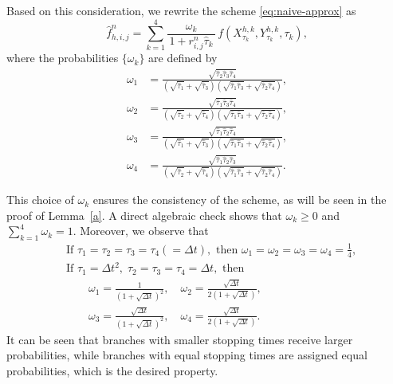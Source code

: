 \documentclass[11pt]{article}
\theoremstyle{mythm}
\theoremstyle{definition}
\begin{document}
	Based on this consideration, we rewrite the scheme \eqref{eq:naive-approx} as
	\begin{equation}\label{eq:weighted-scheme}
		\hat f_{h,i,j}^n
		= \sum_{k=1}^4 \frac{\omega_k}{\,1+r_{i,j}^n\hat\tau_k\,}\,
		f(X_{\tau_k}^{h,k}, Y_{\tau_k}^{h,k}, \tau_k),
	\end{equation}
	where the probabilities $\{\omega_k\}$ are defined by
	\begin{equation}\label{eq:omega}
		\begin{aligned}
			\omega_1 &= \frac{\sqrt{\hat\tau_2 \hat\tau_3 \hat\tau_4}}
			{(\sqrt{\hat\tau_1}+\sqrt{\hat\tau_3})(\sqrt{\hat\tau_1 \hat\tau_3}+\sqrt{\hat\tau_2 \hat\tau_4})},\\
			\omega_2 &= \frac{\sqrt{\hat\tau_1 \hat\tau_3 \hat\tau_4}}
			{(\sqrt{\hat\tau_2}+\sqrt{\hat\tau_4})(\sqrt{\hat\tau_1 \hat\tau_3}+\sqrt{\hat\tau_2 \hat\tau_4})},\\
			\omega_3 &= \frac{\sqrt{\hat\tau_1 \hat\tau_2 \hat\tau_4}}
			{(\sqrt{\hat\tau_1}+\sqrt{\hat\tau_3})(\sqrt{\hat\tau_1 \hat\tau_3}+\sqrt{\hat\tau_2 \hat\tau_4})},\\
			\omega_4 &= \frac{\sqrt{\hat\tau_1 \hat\tau_2 \hat\tau_3}}
			{(\sqrt{\hat\tau_2}+\sqrt{\hat\tau_4})(\sqrt{\hat\tau_1 \hat\tau_3}+\sqrt{\hat\tau_2 \hat\tau_4})}.
		\end{aligned}
	\end{equation}
	
	This choice of $\omega_k$ ensures the consistency of the scheme, as will be seen in the proof of Lemma~\ref{a}. A direct algebraic check shows that $\omega_k \ge 0$ and $\sum_{k=1}^4 \omega_k = 1$. Moreover, we observe that
	\[
	\begin{aligned}
		&\text{If } \tau_1 = \tau_2 = \tau_3 = \tau_4 (= \Delta t),
		\text{ then } \omega_1 = \omega_2 = \omega_3 = \omega_4 = \tfrac14,\\
		&\text{If } \tau_1 = \Delta t^2, \; \tau_2 = \tau_3 = \tau_4 = \Delta t, \text{ then}\\
		&\qquad \omega_1 = \frac{1}{(\!1+\sqrt{\Delta t}\!)^2},\quad
		\omega_2 = \frac{\sqrt{\Delta t}}{2(\!1+\sqrt{\Delta t}\!)},\\
		&\qquad \omega_3 = \frac{\sqrt{\Delta t}}{(\!1+\sqrt{\Delta t}\!)^2},\quad
		\omega_4 = \frac{\sqrt{\Delta t}}{2(\!1+\sqrt{\Delta t}\!)}.
	\end{aligned}
	\]
	It can be seen that branches with smaller stopping times receive larger probabilities, while branches with equal stopping times are assigned equal probabilities, which is the desired property.
	
\end{document}
